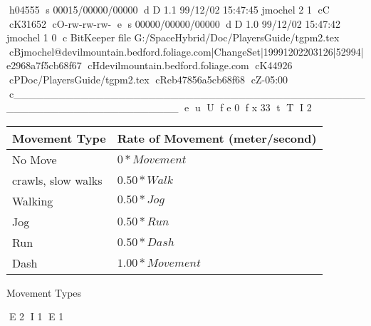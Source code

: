 h04555
s 00015/00000/00000
d D 1.1 99/12/02 15:47:45 jmochel 2 1
cC
cK31652
cO-rw-rw-rw-
e
s 00000/00000/00000
d D 1.0 99/12/02 15:47:42 jmochel 1 0
c BitKeeper file G:/SpaceHybrid/Doc/PlayersGuide/tgpm2.tex
cBjmochel@devilmountain.bedford.foliage.com|ChangeSet|19991202203126|52994|e2968a7f5cb68f67
cHdevilmountain.bedford.foliage.com
cK44926
cPDoc/PlayersGuide/tgpm2.tex
cReb47856a5cb68f68
cZ-05:00
c______________________________________________________________________
e
u
U
f e 0
f x 33
t
T
I 2
\begin{SHTable}
	\begin{tabular}{ll}
	Movement Type		& Rate of Movement (meter/second) \\ 
\hline
	No Move             & \( 0 * Movement \) \\
	crawls, slow walks 	& \( 0.50 * Walk  \) \\
	Walking             & \( 0.50 * Jog   \) \\
	Jog					& \( 0.50 * Run   \) \\
	Run                 & \( 0.50 * Dash  \) \\
	Dash                & \( 1.00 * Movement \) \\ \hline
	\end{tabular}
    \caption{Movement Types}
\end{SHTable}
E 2
I 1
E 1
